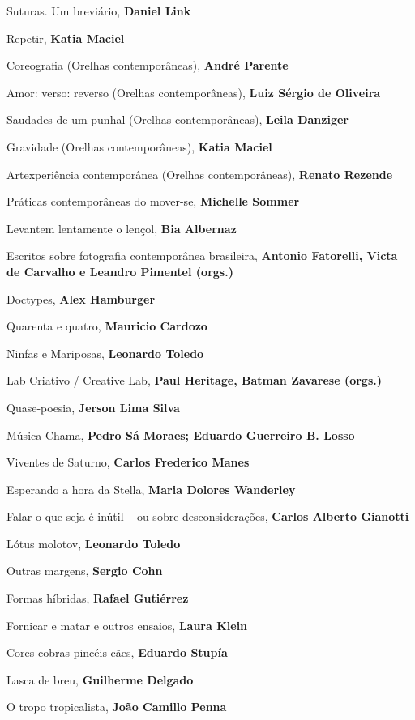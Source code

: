 \begin{multicols}{2}
\begin{enumerate}
{\item Suturas. Um breviário, \textbf{Daniel Link}
\item Repetir, \textbf{Katia Maciel}
\item Coreografia (Orelhas contemporâneas), \textbf{André Parente}
\item Amor: verso: reverso (Orelhas contemporâneas), \textbf{Luiz Sérgio de Oliveira}
\item Saudades de um punhal (Orelhas contemporâneas), \textbf{Leila Danziger}
\item Gravidade (Orelhas contemporâneas), \textbf{Katia Maciel}
\item Artexperiência contemporânea (Orelhas contemporâneas), \textbf{Renato Rezende}
\item Práticas contemporâneas do mover-se, \textbf{Michelle Sommer}
\item Levantem lentamente o lençol, \textbf{Bia Albernaz}
\item Escritos sobre fotografia contemporânea brasileira, \textbf{Antonio Fatorelli, Victa de Carvalho e Leandro Pimentel (orgs.)}
\item Doctypes, \textbf{Alex Hamburger}
\item Quarenta e quatro, \textbf{Mauricio Cardozo}
\item Ninfas e Mariposas, \textbf{Leonardo Toledo}
\item Lab Criativo / Creative Lab, \textbf{Paul Heritage, Batman Zavarese (orgs.)}
\item Quase-poesia, \textbf{Jerson Lima Silva}
\item Música Chama, \textbf{Pedro Sá Moraes; Eduardo Guerreiro B. Losso}
\item Viventes de Saturno, \textbf{Carlos Frederico Manes}
\item Esperando a hora da Stella, \textbf{Maria Dolores Wanderley}
\item Falar o que seja é inútil – ou sobre desconsiderações, \textbf{Carlos Alberto Gianotti}
\item Lótus molotov, \textbf{Leonardo Toledo}
\item Outras margens, \textbf{Sergio Cohn}
\item Formas híbridas, \textbf{Rafael Gutiérrez}
\item Fornicar e matar e outros ensaios, \textbf{Laura Klein}
\item Cores cobras pincéis cães, \textbf{Eduardo Stupía}
\item Lasca de breu, \textbf{Guilherme Delgado}
\item O tropo tropicalista, \textbf{João Camillo Penna}
}
\end{enumerate}
\end{multicols}
